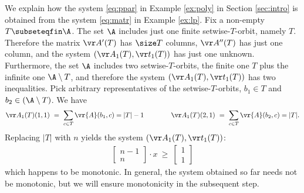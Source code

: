 \begin{slexample} \label{ex:cont}
We explain how the system \eqref{eq:ppar} in Example \ref{ex:poly} in Section \ref{sec:intro}
is obtained from
the system \eqref{eq:matr} in Example \ref{ex:lp}.
%
Fix a non-empty $T \subseteqfin \A$. 
The set $\A$ includes just one finite setwise-$T$-orbit, namely $T$.
Therefore the matrix $\vr A'(T)$ has $\size T$ columns, $\vr A''(T)$ has just one column,
and the system $(\vr A_1(T), \vr t_1(T))$ has just one unknown.
Furthermore, the set $\A$ includes two setwise-$T$-orbits, the finite one $T$ plus the
infinite one $\A \setminus T$,
and therefore the system $(\vr A_1(T), \vr t_1(T))$ has two inequalities.
Pick arbitrary representatives of the setwise-$T$-orbits, $b_1 \in T$ and $b_2 \in (\A\setminus T)$.
We have
\begin{align*}
\vr A_1(T)(1,1) \  = \ \sum_{c\in T }\vr{A}(b_1, c) = |T| - 1 
\qquad\qquad
\vr A_1(T)(2,1) \  = \  \sum_{c\in T}\vr{A}(b_2, c) = |T|.
\end{align*}
Replacing $|T|$ with $n$ yields the system $(\vr A_1(T), \vr t_1(T))$: %
\begin{align} \label{eq:pparnmon}
\begin{bmatrix}
n-1 \\
n
\end{bmatrix}
\cdot
x
\ \geq \ 
\begin{bmatrix}
1 \\
1
\end{bmatrix}
\end{align}
which happens to be monotonic.
In general, the system obtained so far needs not be monotonic,
but we will ensure monotonicity in the subsequent step.
%
\end{slexample}


